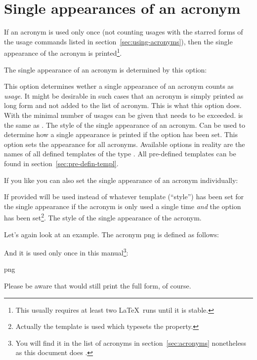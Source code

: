 \documentclass{acro-manual}
\begin{document}
\section{Single appearances of an acronym}\label{sec:single-appe-an}
If an acronym is used only once (not counting usages with the starred forms of
the usage commands listed in section~\vref{sec:using-acronyms}), then the
single appearance of the acronym is printed\footnote{This usually requires at
  least two \LaTeX\ runs until it is stable.}.

The single appearance of an acronym is determined by this option:
\begin{options}
    This option determines wether a single appearance of an acronym counts as
    \emph{usage}. It might be desirable in such cases that an acronym is
    simply printed as long form and not added to the list of acronym.  This is
    what this option does.  With  the minimal number of usages
    can be given that needs to be exceeded.   is the same as
    .
    The style of the single appearance of an acronym.  Can be used to
    determine how a single appearance is printed if the option 
    has been set. This option sets the appearance for all acronyms.
    Available options in reality are the names of all defined templates of the
    type . All pre-defined templates can be found in
    section~\vref{sec:pre-defin-templ}.
\end{options}

If you like you can also set the single appearance of an acronym individually:
\begin{properties}
  \Default
    If provided  will be used instead of whatever template
    (\enquote{style}) has been set for the single appearance if the acronym is
    only used a single time \emph{and} the option  has been
    set\footnote{Actually the template  is used which
      typesets the  property.}.
  \Default
    The style of the single appearance of the acronym.
\end{properties}
Let's again look at an example. The acronym \acs*{png} is defined as follows:
\begin{sourcecode}
\end{sourcecode}
And it is used only once in this manual\footnote{You will find it in the list
  of acronyms in section~\ref{sec:acronyms} nonetheless as this document does
  .}:
\begin{example}
  \ac{png}
\end{example}  
Please be aware that  would still print the full form, of course.
\end{document}

